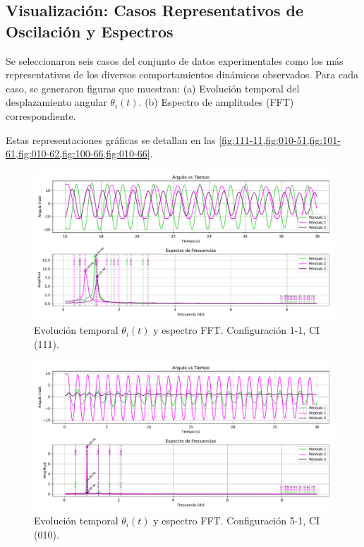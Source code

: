 \subsection*{Visualizaci\'on: Casos Representativos de Oscilaci\'on y Espectros}

Se seleccionaron seis casos del conjunto de datos experimentales como los
m\'as representativos de los diversos comportamientos din\'amicos observados.
Para cada caso, se generaron figuras que muestran:
(a) Evoluci\'on temporal del desplazamiento angular $\theta_i(t)$.
(b) Espectro de amplitudes (FFT) correspondiente.

Estas representaciones gr\'aficas se detallan en las
\cref{fig:111-11,fig:010-51,fig:101-61,fig:010-62,fig:100-66,fig:010-66}.

\begin{figure}[htbp!]
  \centering
  \includegraphics[width=0.8\linewidth]{./Figures/111_11_filtrado.pdf}
  \caption{Evoluci\'on temporal $\theta_i(t)$ y espectro FFT.
  Configuraci\'on 1-1, CI (111).}
  \label{fig:111-11}
\end{figure}

\begin{figure}[htbp!]
  \centering
  \includegraphics[width=0.8\linewidth]{./Figures/010_15_filtrado.pdf}
  \caption{Evoluci\'on temporal $\theta_i(t)$ y espectro FFT.
  Configuraci\'on 5-1, CI (010).}
  \label{fig:010-51}
\end{figure}

